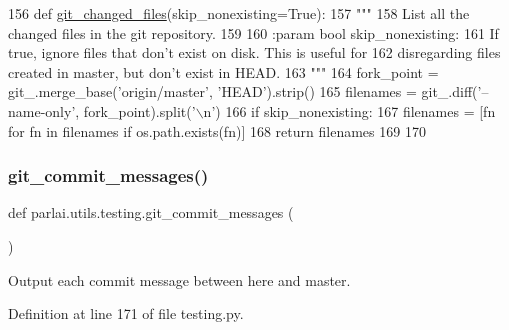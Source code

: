 \begin{DoxyCode}
156 \textcolor{keyword}{def }\hyperlink{namespaceparlai_1_1utils_1_1testing_a2e61f8f35b8ccf518e3561a224781ced}{git\_changed\_files}(skip\_nonexisting=True):
157     \textcolor{stringliteral}{"""}
158 \textcolor{stringliteral}{    List all the changed files in the git repository.}
159 \textcolor{stringliteral}{}
160 \textcolor{stringliteral}{    :param bool skip\_nonexisting:}
161 \textcolor{stringliteral}{        If true, ignore files that don't exist on disk. This is useful for}
162 \textcolor{stringliteral}{        disregarding files created in master, but don't exist in HEAD.}
163 \textcolor{stringliteral}{    """}
164     fork\_point = git\_.merge\_base(\textcolor{stringliteral}{'origin/master'}, \textcolor{stringliteral}{'HEAD'}).strip()
165     filenames = git\_.diff(\textcolor{stringliteral}{'--name-only'}, fork\_point).split(\textcolor{stringliteral}{'\(\backslash\)n'})
166     \textcolor{keywordflow}{if} skip\_nonexisting:
167         filenames = [fn \textcolor{keywordflow}{for} fn \textcolor{keywordflow}{in} filenames \textcolor{keywordflow}{if} os.path.exists(fn)]
168     \textcolor{keywordflow}{return} filenames
169 
170 
\end{DoxyCode}
\mbox{\label{namespaceparlai_1_1utils_1_1testing_aa9971204bea89f174596698b2e736214}} 
\subsubsection{\texorpdfstring{git\+\_\+commit\+\_\+messages()}{git\_commit\_messages()}}
{\footnotesize\ttfamily def parlai.\+utils.\+testing.\+git\+\_\+commit\+\_\+messages (\begin{DoxyParamCaption}{ }\end{DoxyParamCaption})}

\begin{DoxyVerb}Output each commit message between here and master.
\end{DoxyVerb}
 

Definition at line 171 of file testing.\+py.


